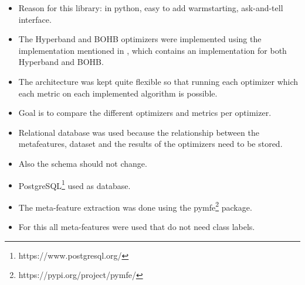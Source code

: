 \begin{itemize}
    \item Reason for this library: in python, easy to add warmstarting, ask-and-tell interface.
    \item The Hyperband and BOHB optimizers were implemented using the implementation mentioned in \cite{Falkner2018BOHB:Scale}, which contains an implementation for both Hyperband and BOHB.
    \item The architecture was kept quite flexible so that running each optimizer which each metric on each implemented algorithm is possible.
    \item Goal is to compare the different optimizers and metrics per optimizer.
    \item Relational database was used because the relationship between the metafeatures, dataset and the results of the optimizers need to be stored.
    \item Also the schema should not change.
    \item PostgreSQL\footnote{https://www.postgresql.org/} used as database.
    \item The meta-feature extraction was done using the pymfe\footnote{https://pypi.org/project/pymfe/} \cite{Rivolli2018TowardsMeta-learning} package.
    \item For this all meta-features were used that do not need class labels.
\end{itemize}

